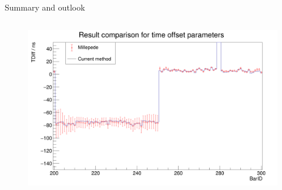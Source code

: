 \documentclass[compress, 13pt, aspectratio=169]{beamer}
\begin{document}
\begin{frame}[t]{Summary and outlook}
\begin{columns}[t]
\begin{column}[t]{0.45\textwidth}
			\begin{figure}[t]
				\centering
				\includegraphics[keepaspectratio, height = 0.5\textheight]{t_error_diff.png}
			\end{figure}

		\end{column}

	\end{columns}

\end{frame}
\end{document}
